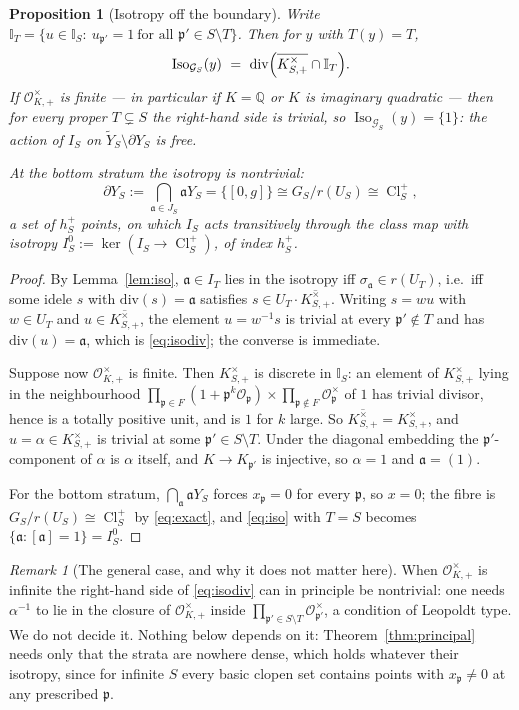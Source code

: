 \documentclass[11pt]{amsart}
\numberwithin{equation}{section}
\newtheorem{proposition}[theorem]{Proposition}
\theoremstyle{definition}
\theoremstyle{remark}
\newtheorem{remark}[theorem]{Remark}
\newcommand{\Q}{\mathbb{Q}}
\newcommand{\cG}{\mathcal{G}}
\newcommand{\cO}{\mathcal{O}}
\newcommand{\pp}{\mathfrak{p}}
\newcommand{\aaa}{\mathfrak{a}}
\newcommand{\Idl}{\mathbb{I}}
\newcommand{\Cl}{\operatorname{Cl}}
\newcommand{\Iso}{\operatorname{Iso}}
\begin{document}
\begin{proposition}[Isotropy off the boundary]\label{prop:nojump}
Write $\Idl_T=\{u\in\Idl_S:\ u_{\pp'}=1\ \text{for all }\pp'\in S\setminus T\}$. Then for
$y$ with $T(y)=T$,
\begin{equation}\label{eq:isodiv}
\Iso_{\cG_S}(y)\ =\ \mathrm{div}\Bigl(\overline{K^\times_{S,+}}\cap\Idl_T\Bigr).
\end{equation}
If $\cO^\times_{K,+}$ is finite --- in particular if $K=\Q$ or $K$ is imaginary quadratic
--- then for every proper $T\subsetneq S$ the right-hand side is trivial, so
$\Iso_{\cG_S}(y)=\{1\}$: the action of $I_S$ on $\widetilde Y_S\setminus\partial Y_S$ is free.

At the bottom stratum the isotropy is nontrivial:
\[
\partial Y_S:=\bigcap_{\aaa\in J_S}\aaa Y_S=\bigl\{[0,g]\bigr\}\cong G_S/r(U_S)\cong\Cl^+_S,
\]
a set of $h^+_S$ points, on which $I_S$ acts transitively through the class map with
isotropy $I_S^0:=\ker(I_S\to\Cl^+_S)$, of index $h^+_S$.
\end{proposition}

\begin{proof}
By Lemma~\ref{lem:iso}, $\aaa\in I_T$ lies in the isotropy iff $\sigma_\aaa\in r(U_T)$, i.e.\
iff some idele $s$ with $\mathrm{div}(s)=\aaa$ satisfies $s\in U_T\cdot\overline{K^\times_{S,+}}$.
Writing $s=wu$ with $w\in U_T$ and $u\in\overline{K^\times_{S,+}}$, the element $u=w^{-1}s$
is trivial at every $\pp'\notin T$ and has $\mathrm{div}(u)=\aaa$, which is \eqref{eq:isodiv};
the converse is immediate.

Suppose now $\cO^\times_{K,+}$ is finite. Then $K^\times_{S,+}$ is discrete in $\Idl_S$: an
element of $K^\times_{S,+}$ lying in the neighbourhood $\prod_{\pp\in F}(1+\pp^k\cO_\pp)\times\prod_{\pp\notin F}\cO_\pp^\times$
of $1$ has trivial divisor, hence is a totally positive unit, and is $1$ for $k$ large. So
$\overline{K^\times_{S,+}}=K^\times_{S,+}$, and $u=\alpha\in K^\times_{S,+}$ is trivial at some
$\pp'\in S\setminus T$. Under the diagonal embedding the $\pp'$-component of $\alpha$ is
$\alpha$ itself, and $K\to K_{\pp'}$ is injective, so $\alpha=1$ and $\aaa=(1)$.

For the bottom stratum, $\bigcap_\aaa\aaa Y_S$ forces $x_\pp=0$ for every $\pp$, so $x=0$;
the fibre is $G_S/r(U_S)\cong\Cl^+_S$ by \eqref{eq:exact}, and \eqref{eq:iso} with $T=S$
becomes $\{\aaa:[\aaa]=1\}=I_S^0$.
\end{proof}

\begin{remark}[The general case, and why it does not matter here]\label{rem:leopoldt}
When $\cO^\times_{K,+}$ is infinite the right-hand side of \eqref{eq:isodiv} can in
principle be nontrivial: one needs $\alpha^{-1}$ to lie in the closure of
$\cO^\times_{K,+}$ inside $\prod_{\pp'\in S\setminus T}\cO^\times_{\pp'}$, a condition of
Leopoldt type. We do not decide it. Nothing below depends on it:
Theorem~\ref{thm:principal} needs only that the strata are nowhere dense, which holds
whatever their isotropy, since for infinite $S$ every basic clopen set contains points with
$x_\pp\ne0$ at any prescribed $\pp$.
\end{remark}
\end{document}
